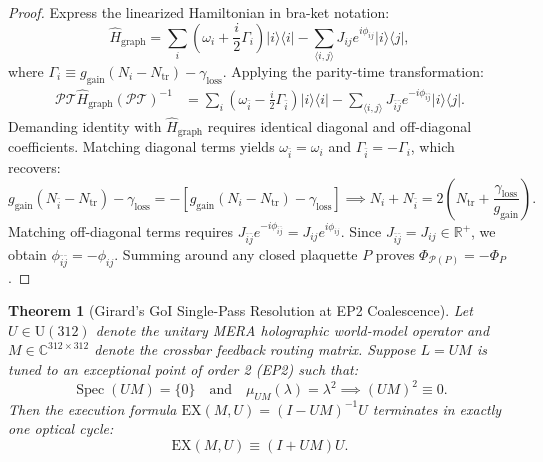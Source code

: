 \documentclass[11pt,onecolumn]{article}
\newtheorem{theorem}{Theorem}
\begin{document}
\begin{proof}
Express the linearized Hamiltonian in bra-ket notation:
\begin{equation}
    \hat{H}_{\mathrm{graph}} = \sum_{i} \left(\omega_i + \frac{i}{2}\Gamma_i\right)|i\rangle\langle i| - \sum_{\langle i, j \rangle} J_{ij} e^{i\phi_{ij}}|i\rangle\langle j|,
\end{equation}
where $\Gamma_i \equiv g_{\mathrm{gain}}(N_i - N_{\mathrm{tr}}) - \gamma_{\mathrm{loss}}$. Applying the parity-time transformation:
\begin{align}
    \mathcal{P}\mathcal{T} \hat{H}_{\mathrm{graph}} (\mathcal{P}\mathcal{T})^{-1} &= \sum_i \left(\omega_{\bar{i}} - \frac{i}{2}\Gamma_{\bar{i}}\right)|i\rangle\langle i| - \sum_{\langle i, j \rangle} J_{\bar{i}\bar{j}} e^{-i\phi_{\bar{i}\bar{j}}}|i\rangle\langle j|.
\end{align}
Demanding identity with $\hat{H}_{\mathrm{graph}}$ requires identical diagonal and off-diagonal coefficients. Matching diagonal terms yields $\omega_{\bar{i}} = \omega_i$ and $\Gamma_{\bar{i}} = -\Gamma_i$, which recovers:
\begin{equation}
    g_{\mathrm{gain}}(N_{\bar{i}} - N_{\mathrm{tr}}) - \gamma_{\mathrm{loss}} = -\left[ g_{\mathrm{gain}}(N_i - N_{\mathrm{tr}}) - \gamma_{\mathrm{loss}} \right] \implies N_i + N_{\bar{i}} = 2\left(N_{\mathrm{tr}} + \frac{\gamma_{\mathrm{loss}}}{g_{\mathrm{gain}}}\right).
\end{equation}
Matching off-diagonal terms requires $J_{\bar{i}\bar{j}} e^{-i\phi_{\bar{i}\bar{j}}} = J_{ij} e^{i\phi_{ij}}$. Since $J_{\bar{i}\bar{j}} = J_{ij} \in \mathbb{R}^+$, we obtain $\phi_{\bar{i}\bar{j}} = -\phi_{ij}$. Summing around any closed plaquette $P$ proves $\Phi_{\mathcal{P}(P)} = -\Phi_P$.
\end{proof}

\begin{theorem}[Girard's GoI Single-Pass Resolution at EP2 Coalescence]
\label{thm:goi_ep2_coalescence}
Let $U \in \mathrm{U}(312)$ denote the unitary MERA holographic world-model operator and $M \in \mathbb{C}^{312 \times 312}$ denote the crossbar feedback routing matrix. Suppose $L = UM$ is tuned to an exceptional point of order 2 (EP2) such that:
\begin{equation}
    \operatorname{Spec}(UM) = \{0\} \quad \text{and} \quad \mu_{UM}(\lambda) = \lambda^2 \implies (UM)^2 \equiv 0.
\end{equation}
Then the execution formula $\mathrm{EX}(M, U) = (I - UM)^{-1}U$ terminates in exactly one optical cycle:
\begin{equation}
    \mathrm{EX}(M, U) \equiv (I + UM)U.
    \label{eq:pt_goi_closed_form}
\end{equation}
\end{theorem}
\end{document}
